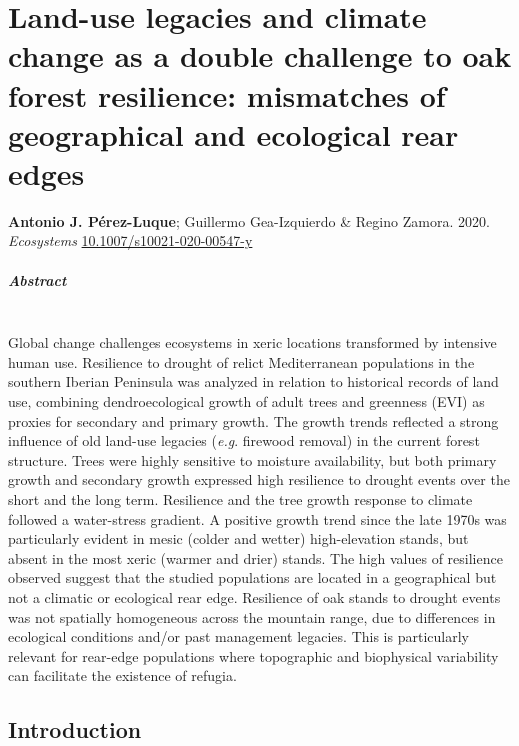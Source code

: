 %
\chapter{Land-use legacies and climate change as a double challenge to oak forest resilience: mismatches of geographical and ecological rear edges}\label{sec:dendro}

\mbox{}
\vfill
{\color{ctcolormain}\textbf{Antonio J. Pérez-Luque}}; Guillermo Gea-Izquierdo \& Regino Zamora. 2020. \emph{Ecosystems}  \href{https://doi.org/10.1007/s10021-020-00547-y}{10.1007/s10021-020-00547-y}

\newpage

\paragraph{Abstract} \mbox{} \\
Global change challenges ecosystems in xeric locations transformed by intensive human use. Resilience to drought of relict Mediterranean \Qpy populations in the southern Iberian Peninsula was analyzed in relation to historical records of land use, combining dendroecological growth of adult trees and greenness (EVI) as proxies for secondary and primary growth. The growth trends reflected a strong influence of old land-use legacies (\emph{e.g}. firewood removal) in the current forest structure. Trees were highly sensitive to moisture availability, but both primary growth and secondary growth expressed high resilience to drought events over the short and the long term. Resilience and the tree growth response to climate followed a water-stress gradient. A positive growth trend since the late 1970s was particularly evident in mesic (colder and wetter) high-elevation stands, but absent in the most xeric (warmer and drier) stands. The high values of resilience observed suggest that the studied \Qp populations are located in a geographical but not a climatic or ecological rear edge. Resilience of oak stands to drought events was not spatially homogeneous across the mountain range, due to differences in ecological conditions and/or past management legacies. This is particularly relevant for rear-edge populations where topographic and biophysical variability can facilitate the existence of refugia.

\newpage

\section{Introduction}\label{sec:dendro:Intro}

